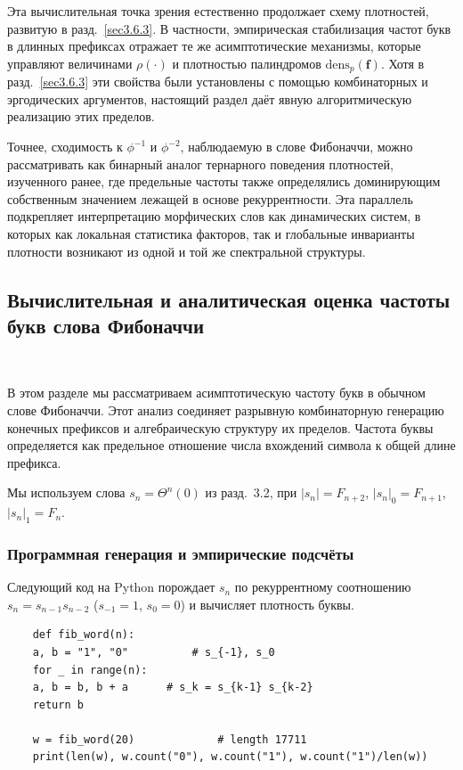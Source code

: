 \documentclass[a4paper,14pt]{extreport}
\theoremstyle{plain}
\theoremstyle{definition}
\theoremstyle{remark}
\begin{document}
Эта вычислительная точка зрения естественно продолжает схему плотностей, развитую в разд.~\ref{sec3.6.3}.
В частности, эмпирическая стабилизация частот букв в длинных префиксах отражает те же асимптотические механизмы, которые управляют величинами $\rho(\cdot)$ и плотностью палиндромов $\mathrm{dens}_p(\mathbf f)$. Хотя в разд.~\ref{sec3.6.3} 
эти свойства были установлены с помощью комбинаторных и эргодических аргументов, настоящий раздел даёт явную алгоритмическую реализацию этих пределов.

Точнее, сходимость к $\phi^{-1}$ и $\phi^{-2}$, наблюдаемую в слове Фибоначчи, можно рассматривать как бинарный аналог тернарного поведения плотностей, изученного ранее, где предельные частоты также определялись доминирующим собственным значением лежащей в основе рекуррентности. Эта параллель подкрепляет интерпретацию морфических слов как динамических систем, в которых как локальная статистика факторов, так и глобальные инварианты плотности возникают из одной и той же спектральной структуры.
\subsection{Вычислительная и аналитическая оценка частоты букв слова Фибоначчи}~\label{sec3.7.1}

В этом разделе мы рассматриваем асимптотическую частоту букв в обычном слове Фибоначчи. Этот анализ соединяет разрывную комбинаторную генерацию конечных префиксов и алгебраическую структуру их пределов. Частота буквы определяется как предельное отношение числа вхождений символа к общей длине префикса.

Мы используем слова $s_n=\Theta^n(0)$ из разд.~3.2, при $|s_n|=F_{n+2}$, $|s_n|_0=F_{n+1}$, $|s_n|_1=F_n$.

\subsubsection{Программная генерация и эмпирические подсчёты}

Следующий код на Python порождает $s_n$ по рекуррентному соотношению $s_n=s_{n-1}s_{n-2}$ ($s_{-1}=1$, $s_0=0$) и вычисляет плотность буквы.

\begin{verbatim}
	def fib_word(n):
	a, b = "1", "0"          # s_{-1}, s_0
	for _ in range(n):
	a, b = b, b + a      # s_k = s_{k-1} s_{k-2}
	return b
	
	w = fib_word(20)             # length 17711
	print(len(w), w.count("0"), w.count("1"), w.count("1")/len(w))
\end{verbatim}
\end{document}
